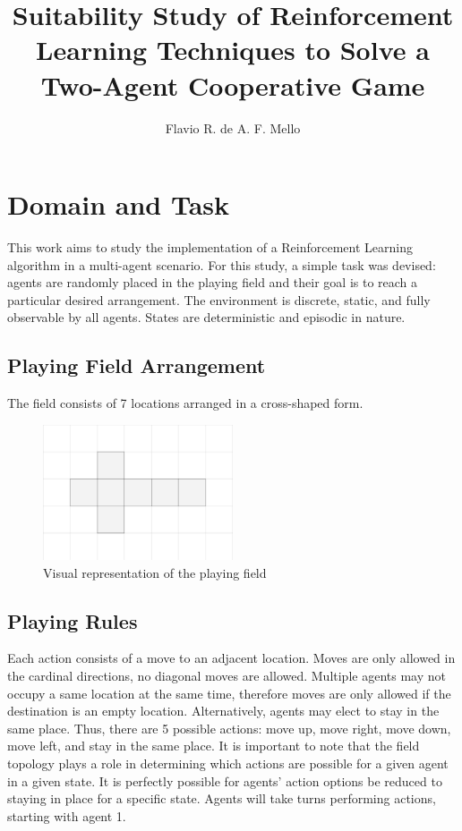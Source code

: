 \documentclass[10pt]{article}
\title{Suitability Study of Reinforcement Learning Techniques to Solve a Two-Agent Cooperative Game}
\author{Flavio R. de A. F. Mello}
\begin{document}
\maketitle

\section{Domain and Task}
    This work aims to study the implementation of a Reinforcement Learning algorithm in a multi-agent scenario. For this study, a simple task was devised: agents are randomly placed in the playing field and their goal is to reach a particular desired arrangement. The environment is discrete, static, and fully observable by all agents. States are deterministic and episodic in nature.

\subsection{Playing Field Arrangement}
    The field consists of 7 locations arranged in a cross-shaped form.

    \begin{figure}[h]
        \centering
        \includegraphics[height=4cm]{./Images/1_Playing_Field.jpg}
        \caption{Visual representation of the playing field}
    \end{figure}

\subsection{Playing Rules}
    Each action consists of a move to an adjacent location. Moves are only allowed in the cardinal directions, no diagonal moves are allowed. Multiple agents may not occupy a same location at the same time, therefore moves are only allowed if the destination is an empty location. Alternatively, agents may elect to stay in the same place. Thus, there are 5 possible actions: move up, move right, move down, move left, and stay in the same place. It is important to note that the field topology plays a role in determining which actions are possible for a given agent in a given state. It is perfectly possible for agents' action options be reduced to staying in place for a specific state. Agents will take turns performing actions, starting with agent 1.
\end{document}
